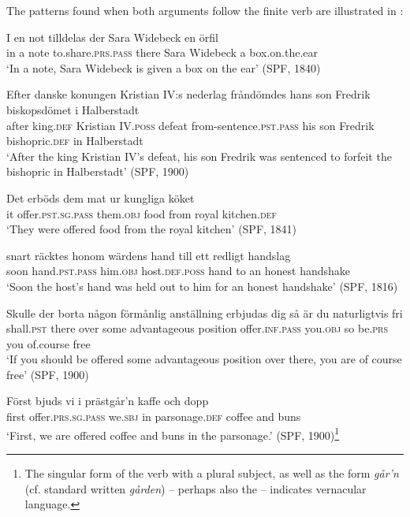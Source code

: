 \documentclass[output=paper]{langscibook}
\begin{document}
The patterns found when both arguments follow the finite verb are illustrated in :


\ea%
    \label{ex:falk:20}
\ea\label{ex:falk:20a}
\gll I  en  not  tilldelas            der  Sara  Widebeck  en  örfil\\
      in  a  note  to.share\textsc{.prs}.\textsc{pass}    there  Sara  Widebeck  a  box.on.the.ear\\
\glt ‘In a note, Sara Widebeck is given a box on the ear’ (SPF, 1840)

\ex\label{ex:falk:20b}
\gll Efter  danske  konungen  Kristian IV:s    nederlag  fråndömdes      hans  son  Fredrik  biskopsdömet  i  Halberstadt\\
after    king.\textsc{def}    Kristian IV.\textsc{poss}  defeat      from-sentence.\textsc{pst}.\textsc{pass}      his   son  Fredrik  bishopric.\textsc{def}  in  Halberstadt\\
\glt ‘After the  king Kristian IV’s defeat, his son Fredrik was sentenced to forfeit the bishopric in Halberstadt’ (SPF, 1900)

\ex\label{ex:falk:20c}
\gll Det  erböds          dem        mat    ur    kungliga    köket\\
      it      offer.\textsc{pst.sg.pass}    them.\textsc{obj}  food  from  royal      kitchen.\textsc{def}\\
\glt ‘They were offered food from the royal kitchen’ (SPF, 1841)

\ex\label{ex:falk:20d}
\gll snart  räcktes        honom    wärdens        hand  till   ett  redligt  handslag\\
      soon  hand\textsc{.pst.pass}  him\textsc{.obj}  host.\textsc{def.poss}   hand  to   an  honest   handshake\\
\glt ‘Soon the host’s hand was held out to him for an honest handshake’ (SPF, 1816)

\ex\label{ex:falk:20e}
\gll Skulle      der  borta  någon  förmånlig    anställning  erbjudas dig         så   är      du    naturligtvis    fri\\
shall.\textsc{pst}     there  over  some    advantageous  position     offer\textsc{.inf}.\textsc{pass}      you\textsc{.obj}   so  be.\textsc{prs}  you  of.course      free\\
\glt ‘If you should be offered some advantageous position over there, you are of         course free’ (SPF, 1900)

\ex\label{ex:falk:20f}
\gll Först  bjuds            vi      i  prästgår’n      kaffe    och  dopp\\
      first  offer\textsc{.prs}.\textsc{sg.pass}    we.\textsc{sbj}  in  parsonage\textsc{.def}  coffee  and  buns\\
\glt ‘First, we are offered coffee and buns in the parsonage.’ (SPF, 1900)\footnote{The singular form of the verb with a plural subject, as well as the form \textit{går’n} (cf. standard written \textit{gården}) – perhaps also the  – indicates vernacular language.}
\z
\z\largerpage
\end{document}
